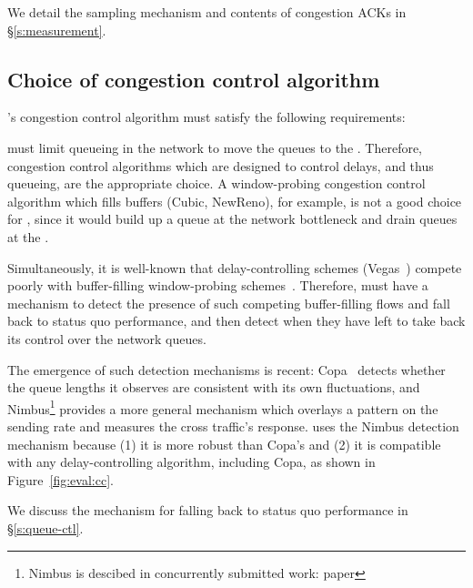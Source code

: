 We detail the sampling mechanism and contents of congestion ACKs in \S\ref{s:measurement}.

\subsection{Choice of congestion control algorithm}
\name's congestion control algorithm must satisfy the following requirements: 

 \name must limit queueing in the network to move the queues to the \inbox. Therefore, congestion control algorithms which are designed to control delays, and thus queueing, are the appropriate choice. 
A window-probing congestion control algorithm which fills buffers (\eg Cubic, NewReno), for example, is not a good choice for \name, since it would build up a queue at the network bottleneck and drain queues at the \inbox.

 Simultaneously, it is well-known that delay-controlling schemes (\eg Vegas~\cite{vegas}) compete poorly with buffer-filling window-probing schemes~\cite{copa}.
Therefore, \name must have a mechanism to detect the presence of such competing buffer-filling flows and fall back to status quo performance, and then detect when they have left to take back its control over the network queues. 

The emergence of such detection mechanisms is recent: Copa~\cite{copa} detects whether the queue lengths it observes are consistent with its own fluctuations, and Nimbus\footnote{Nimbus is descibed in concurrently submitted work: paper } provides a more general mechanism which overlays a pattern on the sending rate and measures the cross traffic's response.
\name uses the Nimbus detection mechanism because (1) it is more robust than Copa's and (2) it is compatible with any delay-controlling algorithm, including Copa, as shown in Figure~\ref{fig:eval:cc}.

We discuss the mechanism for falling back to status quo performance in \S\ref{s:queue-ctl}.

